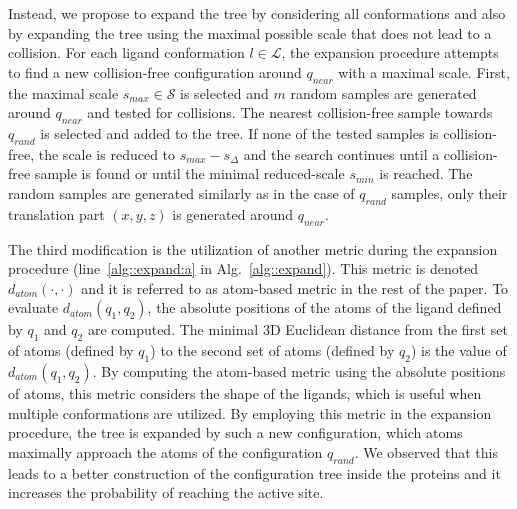 \documentclass[usletter, 10pt, conference]{ieeeconf} %
\def\qrand{q_{rand}}
\def\qnear{q_{near}}
\def\da{d_{atom}}
\def\smin{s_{min}}
\def\smax{s_{max}}
\def\sdelta{s_{\Delta}}
\def\L{\mathcal{L}}
\def\S{\mathcal{S}}
\begin{document}
Instead, we propose to expand the tree by considering all conformations and also by expanding the tree using the maximal possible scale that
does not lead to a collision.
For each ligand conformation $l \in \L$, the expansion procedure attempts to find a new collision-free configuration around $\qnear$ with a maximal scale.
First, the maximal scale $\smax \in \S$ is selected and $m$ random samples are generated around $\qnear$ and tested for collisions.
The nearest collision-free sample towards $\qrand$ is selected and added to the tree.
If none of the tested samples is collision-free, the scale is reduced to $\smax-\sdelta$ and the search continues
until a collision-free sample is found or until the minimal reduced-scale $\smin$ is reached.
The random samples are generated similarly as in the case of $\qrand$ samples, only their translation
part $(x,y,z)$ is generated around $\qnear$.

The third modification is the utilization of another metric during the expansion procedure (line~\ref{alg::expand:a} in Alg.~\ref{alg::expand}).
This metric is denoted $\da(\cdot,\cdot)$ and it is referred to as atom-based metric in the rest of the paper.
To evaluate $\da(q_1,q_2)$, the absolute positions of the atoms of the ligand defined by $q_1$ and $q_2$ are computed.
The minimal 3D Euclidean distance from the first set of atoms (defined by $q_1$) to the second set of atoms (defined by $q_2$) is the value of 
$\da(q_1,q_2)$.
By computing the atom-based metric using the absolute positions of atoms, this metric considers the shape of the ligands, which
is useful when multiple conformations are utilized.
By employing this metric in the expansion procedure, the tree is expanded by such a new configuration, which atoms maximally approach
the atoms of the configuration $\qrand$.
We observed that this leads to a better construction of the configuration tree inside the proteins and it increases the probability
of reaching the active site.

\end{document}

